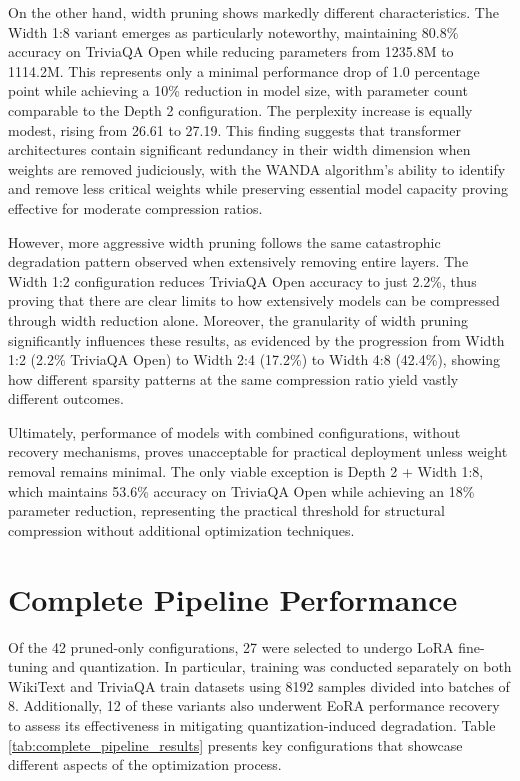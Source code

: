 On the other hand, width pruning shows markedly different characteristics. The Width 1:8 variant emerges as particularly noteworthy, maintaining 80.8\% accuracy on TriviaQA Open while reducing parameters from 1235.8M to 1114.2M. This represents only a minimal performance drop of 1.0 percentage point while achieving a 10\% reduction in model size, with parameter count comparable to the Depth 2 configuration. The perplexity increase is equally modest, rising from 26.61 to 27.19. This finding suggests that transformer architectures contain significant redundancy in their width dimension when weights are removed judiciously, with the WANDA algorithm's ability to identify and remove less critical weights while preserving essential model capacity proving effective for moderate compression ratios.

However, more aggressive width pruning follows the same catastrophic degradation pattern observed when extensively removing entire layers. The Width 1:2 configuration reduces TriviaQA Open accuracy to just 2.2\%, thus proving that there are clear limits to how extensively models can be compressed through width reduction alone.
Moreover, the granularity of width pruning significantly influences these results, as evidenced by the progression from Width 1:2 (2.2\% TriviaQA Open) to Width 2:4 (17.2\%) to Width 4:8 (42.4\%), showing how different sparsity patterns at the same compression ratio yield vastly different outcomes.

Ultimately, performance of models with combined configurations, without recovery mechanisms, proves unacceptable for practical deployment unless weight removal remains minimal. The only viable exception is Depth 2 + Width 1:8, which maintains 53.6\% accuracy on TriviaQA Open while achieving an 18\% parameter reduction, representing the practical threshold for structural compression without additional optimization techniques.



\section{Complete Pipeline Performance}

Of the 42 pruned-only configurations, 27 were selected to undergo LoRA fine-tuning and quantization. In particular, training was conducted separately on both WikiText and TriviaQA train datasets using 8192 samples divided into batches of 8. Additionally, 12 of these variants also underwent EoRA performance recovery to assess its effectiveness in mitigating quantization-induced degradation. Table \ref{tab:complete_pipeline_results} presents key configurations that showcase different aspects of the optimization process.

